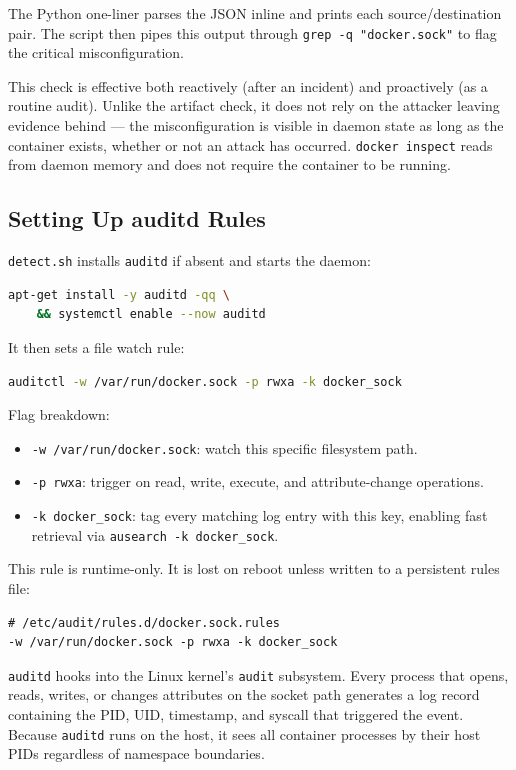 The Python one-liner parses the JSON inline and prints each source/destination pair. The script then pipes this output through \texttt{grep -q "docker.sock"} to flag the critical misconfiguration.

This check is effective both reactively (after an incident) and proactively (as a routine audit). Unlike the artifact check, it does not rely on the attacker leaving evidence behind --- the misconfiguration is visible in daemon state as long as the container exists, whether or not an attack has occurred. \texttt{docker inspect} reads from daemon memory and does not require the container to be running.

\subsection{Setting Up auditd Rules}

\texttt{detect.sh} installs \texttt{auditd} if absent and starts the daemon:

\begin{lstlisting}[language=bash]
apt-get install -y auditd -qq \
    && systemctl enable --now auditd
\end{lstlisting}

It then sets a file watch rule:

\begin{lstlisting}[language=bash]
auditctl -w /var/run/docker.sock -p rwxa -k docker_sock
\end{lstlisting}

Flag breakdown:
\begin{itemize}
    \item \texttt{-w /var/run/docker.sock}: watch this specific filesystem path.
    \item \texttt{-p rwxa}: trigger on read, write, execute, and attribute-change operations.
    \item \texttt{-k docker\_sock}: tag every matching log entry with this key, enabling fast retrieval via \texttt{ausearch -k docker\_sock}.
\end{itemize}

This rule is runtime-only. It is lost on reboot unless written to a persistent rules file:

\begin{lstlisting}
# /etc/audit/rules.d/docker.sock.rules
-w /var/run/docker.sock -p rwxa -k docker_sock
\end{lstlisting}

\texttt{auditd} hooks into the Linux kernel's \texttt{audit} subsystem. Every process that opens, reads, writes, or changes attributes on the socket path generates a log record containing the PID, UID, timestamp, and syscall that triggered the event. Because \texttt{auditd} runs on the host, it sees all container processes by their host PIDs regardless of namespace boundaries.

